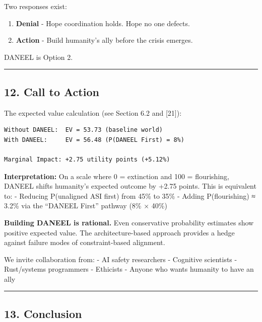 \documentclass[
  11pt,
]{article}
\providecommand{\tightlist}{%
  \setlength{\itemsep}{0pt}\setlength{\parskip}{0pt}}
\begin{document}
Two responses exist:

\begin{enumerate}
\def\labelenumi{\arabic{enumi}.}
\tightlist
\item
  \textbf{Denial} - Hope coordination holds. Hope no one defects.
\item
  \textbf{Action} - Build humanity's ally before the crisis emerges.
\end{enumerate}

DANEEL is Option 2.

\begin{center}\rule{0.5\linewidth}{0.5pt}\end{center}

\subsection{12. Call to Action}\label{call-to-action}

The expected value calculation (see Section 6.2 and {[}21{]}):

\begin{verbatim}
Without DANEEL:  EV = 53.73 (baseline world)
With DANEEL:     EV = 56.48 (P(DANEEL First) = 8%)

Marginal Impact: +2.75 utility points (+5.12%)
\end{verbatim}

\textbf{Interpretation:} On a scale where 0 = extinction and 100 =
flourishing, DANEEL shifts humanity's expected outcome by +2.75 points.
This is equivalent to: - Reducing P(unaligned ASI first) from 45\% to
35\% - Adding P(flourishing) ≈ 3.2\% via the ``DANEEL First'' pathway
(8\% × 40\%)

\textbf{Building DANEEL is rational.} Even conservative probability
estimates show positive expected value. The architecture-based approach
provides a hedge against failure modes of constraint-based alignment.

We invite collaboration from: - AI safety researchers - Cognitive
scientists - Rust/systems programmers - Ethicists - Anyone who wants
humanity to have an ally

\begin{center}\rule{0.5\linewidth}{0.5pt}\end{center}

\subsection{13. Conclusion}\label{conclusion}
\end{document}
